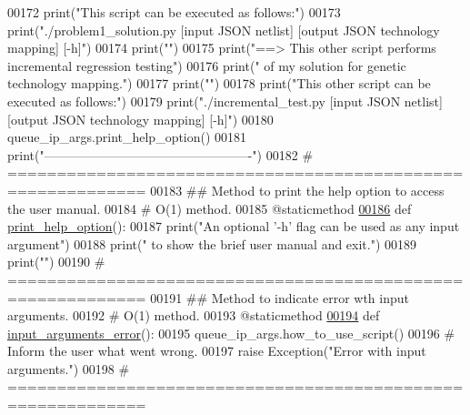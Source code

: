 \begin{DoxyCode}
00172         print(\textcolor{stringliteral}{"This script can be executed as follows:"})
00173         print(\textcolor{stringliteral}{"./problem1\_solution.py [input JSON netlist] [output JSON technology mapping] [-h]"})
00174         print(\textcolor{stringliteral}{""})
00175         print(\textcolor{stringliteral}{"==>  This other script performs incremental regression testing"})
00176         print(\textcolor{stringliteral}{" of my solution for genetic technology mapping."})
00177         print(\textcolor{stringliteral}{""})
00178         print(\textcolor{stringliteral}{"This other script can be executed as follows:"})
00179         print(\textcolor{stringliteral}{"./incremental\_test.py [input JSON netlist] [output JSON technology mapping] [-h]"})
00180         queue\_ip\_args.print\_help\_option()
00181         print(\textcolor{stringliteral}{"-------------------------------------------------"})
00182     \textcolor{comment}{# ============================================================}
00183     \textcolor{comment}{##  Method to print the help option to access the user manual.}
00184     \textcolor{comment}{#   O(1) method.}
00185     @staticmethod
\hypertarget{queue__ip__arguments_8py_source_l00186}{}\hyperlink{classutilities_1_1queue__ip__arguments_1_1queue__ip__args_a28c79307da87e28e9ac3467290fd5738}{00186}     \textcolor{keyword}{def }\hyperlink{classutilities_1_1queue__ip__arguments_1_1queue__ip__args_a28c79307da87e28e9ac3467290fd5738}{print\_help\_option}():
00187         print(\textcolor{stringliteral}{"An optional '-h' flag can be used as any input argument"})
00188         print(\textcolor{stringliteral}{" to show the brief user manual and exit."})
00189         print(\textcolor{stringliteral}{""})
00190     \textcolor{comment}{# ============================================================}
00191     \textcolor{comment}{##  Method to indicate error wth input arguments.}
00192     \textcolor{comment}{#   O(1) method.}
00193     @staticmethod
\hypertarget{queue__ip__arguments_8py_source_l00194}{}\hyperlink{classutilities_1_1queue__ip__arguments_1_1queue__ip__args_afdfbfffba8afb5e786283dd22d856e93}{00194}     \textcolor{keyword}{def }\hyperlink{classutilities_1_1queue__ip__arguments_1_1queue__ip__args_afdfbfffba8afb5e786283dd22d856e93}{input\_arguments\_error}():
00195         queue\_ip\_args.how\_to\_use\_script()
00196         \textcolor{comment}{# Inform the user what went wrong.}
00197         \textcolor{keywordflow}{raise} Exception(\textcolor{stringliteral}{"Error with input arguments."})
00198     \textcolor{comment}{# ============================================================}

\end{DoxyCode}
